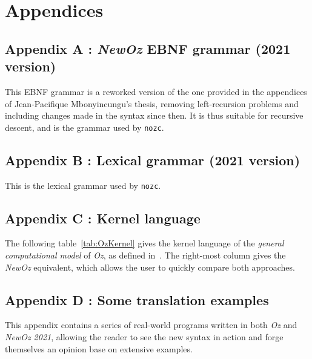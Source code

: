 \appendix
\chapter*{Appendices}
\renewcommand{\thesection}{}

\section{Appendix A : \textit{NewOz} EBNF grammar (2021 version)}\label{sec:appendix-grammar}
This EBNF grammar is a reworked version of the one provided in the appendices of Jean-Pacifique Mbonyincungu's thesis,
removing left-recursion problems and including changes made in the syntax since then.
It is thus suitable for recursive descent, and is the grammar used by \texttt{nozc}.


\section{Appendix B : Lexical grammar (2021 version)}\label{sec:appendix-lexical-grammar}
This is the lexical grammar used by \texttt{nozc}.


\section{Appendix C : Kernel language}\label{sec:appendix-kernel}
The following table~\ref{tab:OzKernel} gives the kernel language of the \textit{general computational model} of \textit{Oz}, as defined in~\cite{van2004concepts}.
The right-most column gives the \textit{NewOz} equivalent, which allows the user to quickly compare both approaches.


\section{Appendix D : Some translation examples}\label{sec:appendix-examples}
This appendix contains a series of real-world programs written in both \textit{Oz} and \textit{NewOz 2021}, allowing the reader to see the new syntax in action and forge themselves an opinion base on extensive examples.







